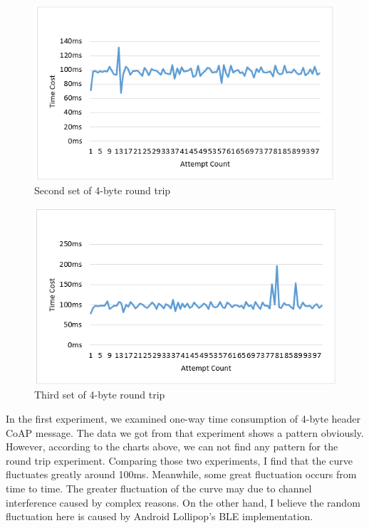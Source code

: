 \documentclass{Nan_Thesis}
\begin{document}
\begin{figure}[H]
  \centering 
      \includegraphics[scale=1]{pic/experiment3result2.png} 
  \caption{Second set of 4-byte round trip}
\end{figure}

\begin{figure}[H]
  \centering 
      \includegraphics[scale=1]{pic/experiment3result3.png} 
  \caption{Third set of 4-byte round trip}
\end{figure}

In the first experiment, we examined one-way time consumption of 4-byte header CoAP message. The data we got from that experiment shows a pattern obviously. However, according to the charts above, we can not find any pattern for the round trip experiment. Comparing those two experiments, I find that the curve fluctuates greatly around 100ms. Meanwhile, some great fluctuation occurs from time to time. The greater fluctuation of the curve may due to channel interference caused by complex reasons. On the other hand, I believe the random fluctuation here is caused by Android Lollipop’s BLE implementation. 
\end{document}
